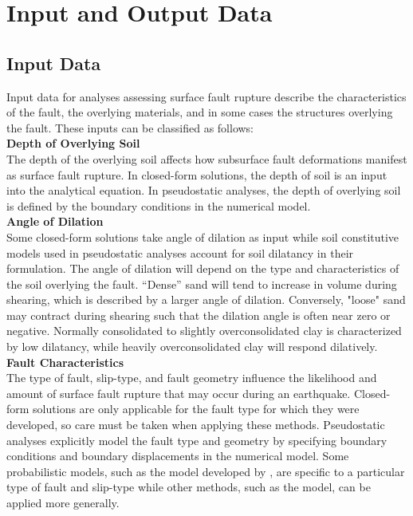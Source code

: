 \section{Input and Output Data}
\label{sec:eq_surface_rup_input_output}

\subsection{Input Data}

Input data for analyses assessing surface fault rupture describe the characteristics of the fault, the overlying materials, and in some cases the structures overlying the fault. These inputs can be classified as follows:\\

\noindent\textbf{Depth of Overlying Soil}\\
The depth of the overlying soil affects how subsurface fault deformations manifest as surface fault rupture. In closed-form solutions, the depth of soil is an input into the analytical equation. In pseudostatic analyses, the depth of overlying soil is defined by the boundary conditions in the numerical model.\\

\noindent\textbf{Angle of Dilation}\\
Some closed-form solutions take angle of dilation as input while soil constitutive models used in pseudostatic analyses account for soil dilatancy in their formulation. The angle of dilation will depend on the type and characteristics of the soil overlying the fault. ``Dense'' sand will tend to increase in volume during shearing, which is described by a larger angle of dilation. Conversely, "loose" sand may contract during shearing such that the dilation angle is often near zero or negative. Normally consolidated to slightly overconsolidated clay is characterized by low dilatancy, while heavily overconsolidated clay will respond dilatively.\\

\noindent\textbf{Fault Characteristics}\\
The type of fault, slip-type, and fault geometry influence the likelihood and amount of surface fault rupture that may occur during an earthquake. Closed-form solutions are only applicable for the fault type for which they were developed, so care must be taken when applying these methods. Pseudostatic analyses explicitly model the fault type and geometry by specifying boundary conditions and boundary displacements in the numerical model. Some probabilistic models, such as the model developed by \cite{moss2011probabilistic}, are specific to a particular type of fault and slip-type while other methods, such as the \cite{hecker2013variability} model, can be applied more generally.\\

